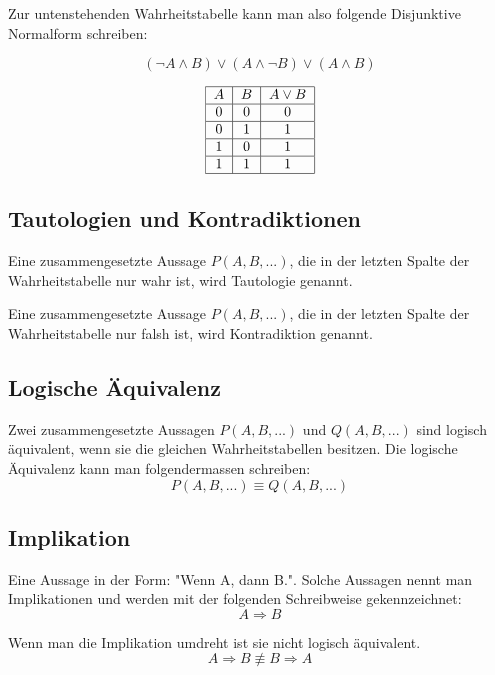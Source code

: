 \documentclass[12pt, a4paper, oneside]{article}
\begin{document}
Zur untenstehenden Wahrheitstabelle kann man also folgende Disjunktive Normalform schreiben:

\begin{equation}
  (\lnot A \land B) \lor (A \land \lnot B) \lor (A \land B)
\end{equation}

\begin{equation}
  \begin{tabular}{|c|c|c|}
  \hline
  $A$ & $B$ & $A \lor B$ \\ \hline
  0 & 0 & 0 \\ \hline
  0 & 1 & 1 \\ \hline
  1 & 0 & 1 \\ \hline
  1 & 1 & 1 \\ \hline
  \end{tabular}
\end{equation} 

\subsection{Tautologien und Kontradiktionen}
Eine zusammengesetzte Aussage $P(A, B,...)$, die in der letzten Spalte der Wahrheitstabelle nur wahr ist, wird Tautologie genannt.

Eine zusammengesetzte Aussage $P(A, B,...)$, die in der letzten Spalte der Wahrheitstabelle nur falsh ist, wird Kontradiktion genannt.

\subsection{Logische Äquivalenz}
Zwei zusammengesetzte Aussagen $P(A, B,...)$ und $Q(A, B,...)$ sind logisch äquivalent, wenn sie die gleichen Wahrheitstabellen besitzen. Die logische Äquivalenz kann man folgendermassen schreiben:
\begin{equation} 
  P(A, B,...) \equiv Q(A, B,...)
\end{equation}

\subsection{Implikation}
Eine Aussage in der Form: "Wenn A, dann B.". Solche Aussagen nennt man Implikationen und werden mit der folgenden Schreibweise gekennzeichnet:
\begin{equation}
  A \Rightarrow B 
\end{equation} 

Wenn man die Implikation umdreht ist sie nicht logisch äquivalent.
\begin{equation}
  A \Rightarrow B \not\equiv B \Rightarrow A
\end{equation}
\end{document}
